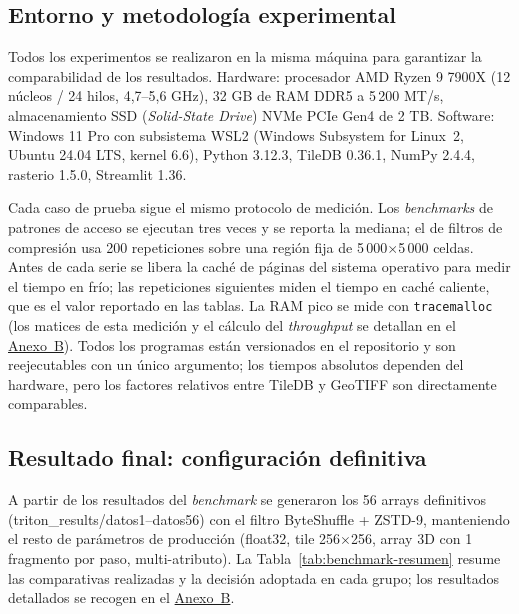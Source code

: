 \subsection{Entorno y metodología experimental}\label{entorno-y-metodologia-experimental}\label{hardware-y-software}

Todos los experimentos se realizaron en la misma máquina para garantizar la comparabilidad de los resultados. Hardware: procesador AMD Ryzen 9 7900X (12 núcleos / 24 hilos, 4,7--5,6 GHz), 32 GB de RAM DDR5 a 5\,200 MT/s, almacenamiento SSD (\textit{Solid-State Drive}) NVMe PCIe Gen4 de 2 TB. Software: Windows 11 Pro con subsistema WSL2 (Windows Subsystem for Linux~2, Ubuntu 24.04 LTS, kernel 6.6), Python 3.12.3, TileDB 0.36.1, NumPy 2.4.4, rasterio 1.5.0, Streamlit 1.36.

\label{protocolo-de-medicion}Cada caso de prueba sigue el mismo protocolo de medición. Los \textit{benchmarks} de patrones de acceso se ejecutan tres veces y se reporta la mediana; el de filtros de compresión usa 200 repeticiones sobre una región fija de 5\,000$\times$5\,000 celdas. Antes de cada serie se libera la caché de páginas del sistema operativo para medir el tiempo en frío; las repeticiones siguientes miden el tiempo en caché caliente, que es el valor reportado en las tablas. La RAM pico se mide con \texttt{tracemalloc} (los matices de esta medición y el cálculo del \textit{throughput} se detallan en el \hyperref[anexo-b.-tablas-de-resultados-completas]{Anexo~B}). Todos los programas están versionados en el repositorio y son reejecutables con un único argumento; los tiempos absolutos dependen del hardware, pero los factores relativos entre TileDB y GeoTIFF son directamente comparables.

\subsection{Resultado final: configuración definitiva}\label{resultado-final-configuracion-definitiva}

A partir de los resultados del \textit{benchmark} se generaron los 56 arrays definitivos (triton\_results/datos1--datos56) con el filtro ByteShuffle + ZSTD-9, manteniendo el resto de parámetros de producción (float32, tile 256$\times$256, array 3D con 1 fragmento por paso, multi-atributo). La Tabla~\ref{tab:benchmark-resumen} resume las comparativas realizadas y la decisión adoptada en cada grupo; los resultados detallados se recogen en el \hyperref[anexo-b.-tablas-de-resultados-completas]{Anexo~B}.


